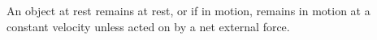 \documentclass[preview]{standalone}
\begin{document}
\begin{center}
An object at rest remains at rest, or if in motion, remains in motion at a constant velocity unless acted on by a net external force.
\end{center}
\end{document}
